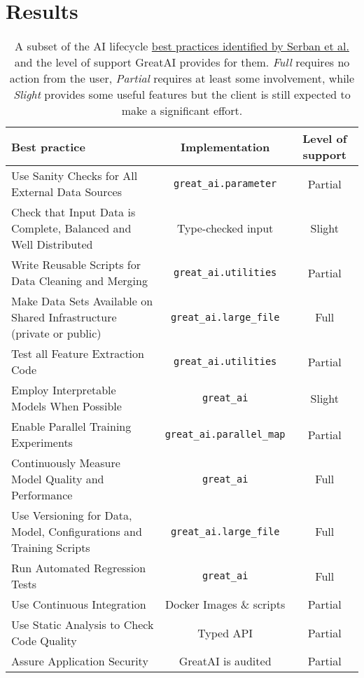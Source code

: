 \section{Results}

\begin{table}
\centering
\caption{A subset of the AI lifecycle \href{https://se-ml.github.io/practices/}{best practices identified by Serban et al.} \cite{serban2020adoption,serban2021practices} and the level of support GreatAI provides for them. \textit{Full} requires no action from the user, \textit{Partial} requires at least some involvement, while \textit{Slight} provides some useful features but the client is still expected to make a significant effort.}
\label{table:best-practices}
\begin{tabular}{p{7cm}@{\hskip 0.5cm}c@{\hskip 0.5cm}c}
\hline
\textbf{Best practice} & \textbf{Implementation} & \textbf{Level of support} \\\hline

Use Sanity Checks for All External Data Sources  & \texttt{great\_ai.parameter} & Partial \\\hline
Check that Input Data is Complete, Balanced and Well Distributed  & Type-checked input & Slight \\\hline
Write Reusable Scripts for Data Cleaning and Merging & \texttt{great\_ai.utilities} & Partial \\\hline
Make Data Sets Available on Shared Infrastructure (private or public) & \texttt{great\_ai.large\_file} & Full \\\hline

Test all Feature Extraction Code & \texttt{great\_ai.utilities} & Partial \\\hline
Employ Interpretable Models When Possible & \texttt{great\_ai} & Slight \\\hline
Enable Parallel Training Experiments & \texttt{great\_ai.parallel\_map} & Partial \\\hline
Continuously Measure Model Quality and Performance & \texttt{great\_ai} & Full \\\hline
Use Versioning for Data, Model, Configurations and Training Scripts & \texttt{great\_ai.large\_file} & Full \\\hline

Run Automated Regression Tests & \texttt{great\_ai} & Full \\\hline
Use Continuous Integration & Docker Images \& scripts & Partial \\\hline
Use Static Analysis to Check Code Quality & Typed API & Partial \\\hline
Assure Application Security & GreatAI is audited & Partial \\\hline


\end{tabular}
\end{table}
